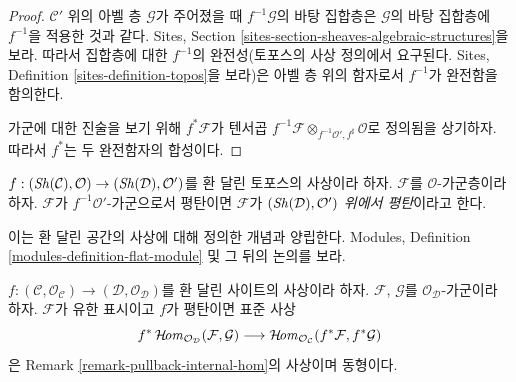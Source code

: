 \begin{proof}
$\mathcal{C}'$ 위의 아벨 층 $\mathcal{G}$가 주어졌을 때
$f^{-1}\mathcal{G}$의 바탕 집합층은 $\mathcal{G}$의 바탕 집합층에
$f^{-1}$을 적용한 것과 같다. Sites, Section
\ref{sites-section-sheaves-algebraic-structures}을 보라. 따라서 집합층에 대한
$f^{-1}$의 완전성(토포스의 사상 정의에서 요구된다. Sites, Definition
\ref{sites-definition-topos}을 보라)은 아벨 층 위의 함자로서 $f^{-1}$가
완전함을 함의한다.

\medskip\noindent
가군에 대한 진술을 보기 위해 $f^*\mathcal{F}$가 텐서곱
$f^{-1}\mathcal{F} \otimes_{f^{-1}\mathcal{O}', f^\sharp} \mathcal{O}$로
정의됨을 상기하자. 따라서 $f^*$는 두 완전함자의 합성이다.
\end{proof}

\begin{definition}
\label{definition-flat-module}
$f : (\mathop{\mathit{Sh}}\nolimits(\mathcal{C}), \mathcal{O}) \to (\mathop{\mathit{Sh}}\nolimits(\mathcal{D}), \mathcal{O}')$를
환 달린 토포스의 사상이라 하자. $\mathcal{F}$를 $\mathcal{O}$-가군층이라
하자. $\mathcal{F}$가 $f^{-1}\mathcal{O}'$-가군으로서 평탄이면
$\mathcal{F}$가 {\it $(\mathop{\mathit{Sh}}\nolimits(\mathcal{D}), \mathcal{O}')$ 위에서 평탄}이라고
한다.
\end{definition}

\noindent
이는 환 달린 공간의 사상에 대해 정의한 개념과 양립한다. Modules,
Definition \ref{modules-definition-flat-module} 및 그 뒤의 논의를 보라.

\begin{lemma}
\label{lemma-pullback-internal-hom}
$f : (\mathcal{C}, \mathcal{O}_\mathcal{C}) \to
(\mathcal{D}, \mathcal{O}_\mathcal{D})$를 환 달린 사이트의 사상이라 하자.
$\mathcal{F}$, $\mathcal{G}$를 $\mathcal{O}_\mathcal{D}$-가군이라 하자.
$\mathcal{F}$가 유한 표시이고 $f$가 평탄이면 표준 사상
$$
f^*\mathop{\mathcal{H}\!\mathit{om}}\nolimits_{\mathcal{O}_\mathcal{D}}(\mathcal{F}, \mathcal{G})
\longrightarrow
\mathop{\mathcal{H}\!\mathit{om}}\nolimits_{\mathcal{O}_\mathcal{C}}(f^*\mathcal{F}, f^*\mathcal{G})
$$
은 Remark \ref{remark-pullback-internal-hom}의 사상이며 동형이다.
\end{lemma}


